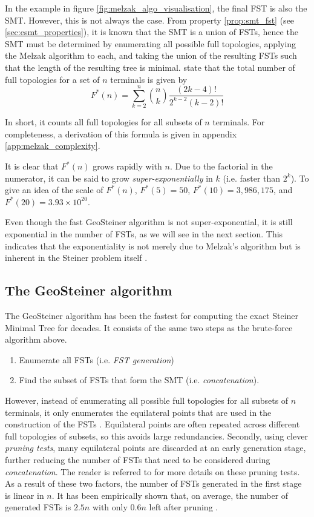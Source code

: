 \documentclass{l4proj}
\begin{document}
In the example in figure \ref{fig:melzak_algo_visualisation}, the final FST is also the SMT. However, this is not always the case. From property \ref{prop:smt_fst} (see \ref{sec:esmt_properties}), it is known that the SMT is a union of FSTs, hence the SMT must be determined by enumerating all possible full topologies, applying the Melzak algorithm to each, and taking the union of the resulting FSTs such that the length of the resulting tree is minimal. \cite{geosteiner96} state that the total number of full topologies for a set of $n$ terminals is given by
$$
    F^*(n) = \sum_{k=2}^{n} \binom{n}{k}\frac{(2k - 4)!}{2^{k-2}(k-2)!}
$$

In short, it counts all full topologies for all subsets of $n$ terminals.
For completeness, a derivation of this formula is given in appendix \ref{app:melzak_complexity}.

It is clear that $F^*(n)$ grows rapidly with $n$. Due to the factorial in the numerator, it can be said to grow \textit{super-exponentially} in $k$ (i.e. faster than $2^k$). To give an idea of the scale of $F^*(n)$, $F^*(5) = 50$, $F^*(10) = 3,986,175$, and $F^*(20) = 3.93 \times 10^{20}$.

Even though the fast GeoSteiner algorithm is not super-exponential, it is still exponential in the number of FSTs, as we will see in the next section. This indicates that the exponentiality is not merely due to Melzak's algorithm but is inherent in the Steiner problem itself \citep{Steiner_tree_problems_hwang}.

\subsection{The GeoSteiner algorithm}
The GeoSteiner algorithm has been the fastest for computing the exact Steiner Minimal Tree for decades.
It consists of the same two steps as the brute-force algorithm above.
\begin{enumerate}
    \item Enumerate all FSTs (i.e. \textit{FST generation})
    \item Find the subset of FSTs that form the SMT (i.e. \textit{concatenation}).
\end{enumerate}
However, instead of enumerating all possible full topologies for all subsets of $n$ terminals, it only enumerates the equilateral points that are used in the construction of the FSTs \citep{geosteiner96}. Equilateral points are often repeated across different full topologies of subsets, so this avoids large redundancies. Secondly, using clever \textit{pruning tests}, many equilateral points are discarded at an early generation stage, further reducing the number of FSTs that need to be considered during \textit{concatenation}. The reader is referred to \cite{geosteiner96} for more details on these pruning tests.
As a result of these two factors, the number of FSTs generated in the first stage is linear in $n$. It has been empirically shown that, on average, the number of generated FSTs is $2.5n$ with only $0.6n$ left after pruning \citep{29ee725d11ac4584b72f7fe66c4326fa}.
\end{document}
